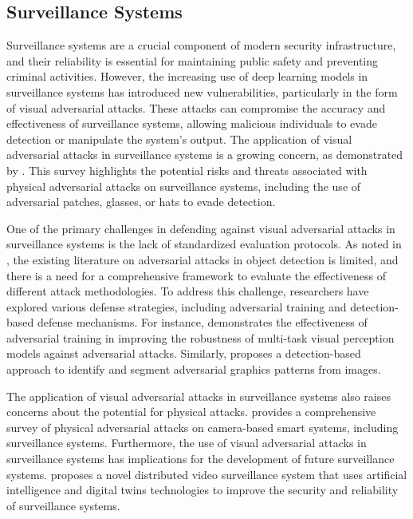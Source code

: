 \documentclass[11pt]{article}
\begin{document}
\subsection{Surveillance Systems}

Surveillance systems are a crucial component of modern security infrastructure, and their reliability is essential for maintaining public safety and preventing criminal activities. However, the increasing use of deep learning models in surveillance systems has introduced new vulnerabilities, particularly in the form of visual adversarial attacks. These attacks can compromise the accuracy and effectiveness of surveillance systems, allowing malicious individuals to evade detection or manipulate the system's output. The application of visual adversarial attacks in surveillance systems is a growing concern, as demonstrated by \cite{ref34}. This survey highlights the potential risks and threats associated with physical adversarial attacks on surveillance systems, including the use of adversarial patches, glasses, or hats to evade detection.

One of the primary challenges in defending against visual adversarial attacks in surveillance systems is the lack of standardized evaluation protocols. As noted in \cite{ref6}, the existing literature on adversarial attacks in object detection is limited, and there is a need for a comprehensive framework to evaluate the effectiveness of different attack methodologies. To address this challenge, researchers have explored various defense strategies, including adversarial training and detection-based defense mechanisms. For instance, \cite{ref113} demonstrates the effectiveness of adversarial training in improving the robustness of multi-task visual perception models against adversarial attacks. Similarly, \cite{ref118} proposes a detection-based approach to identify and segment adversarial graphics patterns from images.

The application of visual adversarial attacks in surveillance systems also raises concerns about the potential for physical attacks. \cite{ref7} provides a comprehensive survey of physical adversarial attacks on camera-based smart systems, including surveillance systems. Furthermore, the use of visual adversarial attacks in surveillance systems has implications for the development of future surveillance systems. \cite{ref119} proposes a novel distributed video surveillance system that uses artificial intelligence and digital twins technologies to improve the security and reliability of surveillance systems.
\end{document}
